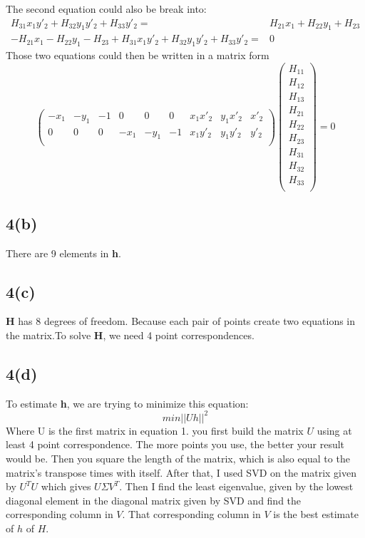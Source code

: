 \documentclass{article}
\begin{document}
The second equation could also be break into:
\begin{equation*}
\begin{aligned}
H_{31}x_1y'_2 + H_{32}y_1y'_2 + H_{33}y'_2 =& H_{21}x_1 + H_{22}y_1 + H_{23}\\
-H_{21}x_1 - H_{22}y_1 - H_{23} + H_{31}x_1y'_2 + H_{32}y_1y'_2 + H_{33}y'_2 =& 0
\end{aligned}
\end{equation*}
Those two equations could then be written in a matrix form
\begin{equation}
\begin{pmatrix}
	-x_1 & -y_1 & -1 & 0 & 0 & 0 & x_1 x'_2 & y_1 x'_2 & x'_2 \\
	0 & 0 & 0 &-x_1 & -y_1 & -1 & x_1 y'_2 & y_1 y'_2 & y'_2 \\
\end{pmatrix}
\begin{pmatrix}
H_{11}\\
H_{12}\\
H_{13}\\
H_{21}\\
H_{22}\\
H_{23}\\
H_{31}\\
H_{32}\\
H_{33}\\
\end{pmatrix}
= 0
\end{equation}
\subsection*{4(b)}
There are 9 elements in \textbf{h}.
\subsection*{4(c)}
\textbf{H} has 8 degrees of freedom. Because each pair of points create two equations in the matrix.To solve \textbf{H}, we need 4 point correspondences.
\subsection*{4(d)}
To estimate \textbf{h}, we are trying to minimize this equation:
\begin{equation*}
min ||Uh||^2
\end{equation*} 
Where U is the first matrix in equation 1. you first build the matrix $U$ using at least 4 point correspondence. The more points you use, the better your result would be. Then you square the length of the matrix, which is also equal to the matrix's transpose times with itself. After that, I used SVD on the matrix given by $U^TU$ which gives $U\Sigma V^T$. Then I find the least eigenvalue, given by the lowest diagonal element in the diagonal matrix given by SVD and find the corresponding column in $V$. That corresponding column in $V$ is the best estimate of $h$ of $H$.
\end{document}
